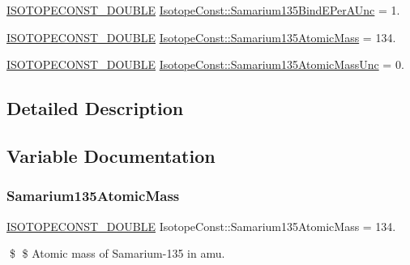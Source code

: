 \begin{DoxyCompactItemize}
\mbox{\hyperlink{group___isotope_const-_macros_ga8f45a7272ce02c0b4c65c44636ed719a}{I\+S\+O\+T\+O\+P\+E\+C\+O\+N\+S\+T\+\_\+\+D\+O\+U\+B\+LE}} \mbox{\hyperlink{group___isotope_const-_samarium-_sm135_gacf9087421a739e8e886796a330399992}{Isotope\+Const\+::\+Samarium135\+Bind\+E\+Per\+A\+Unc}} = 1.
\item 
\mbox{\hyperlink{group___isotope_const-_macros_ga8f45a7272ce02c0b4c65c44636ed719a}{I\+S\+O\+T\+O\+P\+E\+C\+O\+N\+S\+T\+\_\+\+D\+O\+U\+B\+LE}} \mbox{\hyperlink{group___isotope_const-_samarium-_sm135_gaa2ae800a51a982cf4efa14c7f787f8d7}{Isotope\+Const\+::\+Samarium135\+Atomic\+Mass}} = 134.
\item 
\mbox{\hyperlink{group___isotope_const-_macros_ga8f45a7272ce02c0b4c65c44636ed719a}{I\+S\+O\+T\+O\+P\+E\+C\+O\+N\+S\+T\+\_\+\+D\+O\+U\+B\+LE}} \mbox{\hyperlink{group___isotope_const-_samarium-_sm135_ga4695c0fd3d6d5d8c912c4f9d34ce142c}{Isotope\+Const\+::\+Samarium135\+Atomic\+Mass\+Unc}} = 0.
\end{DoxyCompactItemize}


\subsection{Detailed Description}


\subsection{Variable Documentation}
\mbox{\label{group___isotope_const-_samarium-_sm135_gaa2ae800a51a982cf4efa14c7f787f8d7}} 
\subsubsection{\texorpdfstring{Samarium135\+Atomic\+Mass}{Samarium135AtomicMass}}
{\footnotesize\ttfamily \mbox{\hyperlink{group___isotope_const-_macros_ga8f45a7272ce02c0b4c65c44636ed719a}{I\+S\+O\+T\+O\+P\+E\+C\+O\+N\+S\+T\+\_\+\+D\+O\+U\+B\+LE}} Isotope\+Const\+::\+Samarium135\+Atomic\+Mass = 134.}

\$ \$ Atomic mass of Samarium-\/135 in amu. \mbox{\label{group___isotope_const-_samarium-_sm135_ga4695c0fd3d6d5d8c912c4f9d34ce142c}} 
